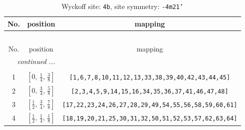 \documentclass[fleqn,8pt]{jsarticle}
\begin{document}
\begin{longtable}{ccc}
\caption{Wyckoff site: {\tt 4b}, site symmetry: {\tt -4m21'}}
 \\
 \hline \hline
No. & position & mapping \\ \hline \endfirsthead

\multicolumn{2}{l}{\tablename\ \thetable{}} \\
 \hline \hline
No. & position & mapping \\ \hline \endhead

 \hline \hline
\multicolumn{2}{r}{\footnotesize\it continued ...} \\ \endfoot

 \hline \hline
\multicolumn{2}{r}{} \\ \endlastfoot

1 & $\left[ 0,\, \frac{1}{4},\, \frac{3}{8} \right]$ & {\tt [1,6,7,8,10,11,12,13,33,38,39,40,42,43,44,45]} \\ \hline
2 & $\left[ 0,\, \frac{3}{4},\, \frac{5}{8} \right]$ & {\tt [2,3,4,5,9,14,15,16,34,35,36,37,41,46,47,48]} \\ \hline
3 & $\left[ \frac{1}{2},\, \frac{3}{4},\, \frac{7}{8} \right]$ & {\tt [17,22,23,24,26,27,28,29,49,54,55,56,58,59,60,61]} \\ \hline
4 & $\left[ \frac{1}{2},\, \frac{1}{4},\, \frac{1}{8} \right]$ & {\tt [18,19,20,21,25,30,31,32,50,51,52,53,57,62,63,64]} \\
\end{longtable}
\renewcommand{\arraystretch}{1.2}
\end{document}
